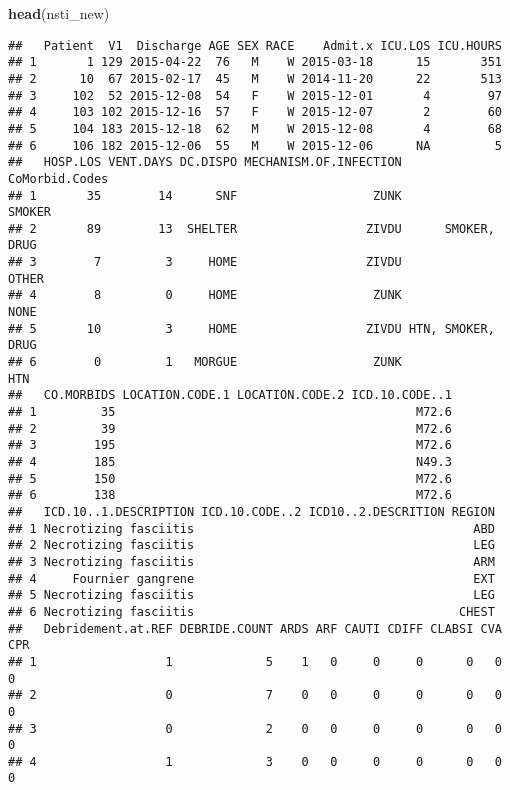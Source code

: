 \documentclass[]{article}
\newenvironment{Shaded}{\begin{snugshade}}{\end{snugshade}}
\newcommand{\KeywordTok}[1]{\textcolor[rgb]{0.13,0.29,0.53}{\textbf{#1}}}
\newcommand{\NormalTok}[1]{#1}
\begin{document}
\begin{Shaded}
\begin{Highlighting}[]
\KeywordTok{head}\NormalTok{(nsti_new)}
\end{Highlighting}
\end{Shaded}

\begin{verbatim}
##   Patient  V1  Discharge AGE SEX RACE    Admit.x ICU.LOS ICU.HOURS
## 1       1 129 2015-04-22  76   M    W 2015-03-18      15       351
## 2      10  67 2015-02-17  45   M    W 2014-11-20      22       513
## 3     102  52 2015-12-08  54   F    W 2015-12-01       4        97
## 4     103 102 2015-12-16  57   F    W 2015-12-07       2        60
## 5     104 183 2015-12-18  62   M    W 2015-12-08       4        68
## 6     106 182 2015-12-06  55   M    W 2015-12-06      NA         5
##   HOSP.LOS VENT.DAYS DC.DISPO MECHANISM.OF.INFECTION    CoMorbid.Codes
## 1       35        14      SNF                   ZUNK            SMOKER
## 2       89        13  SHELTER                  ZIVDU      SMOKER, DRUG
## 3        7         3     HOME                  ZIVDU             OTHER
## 4        8         0     HOME                   ZUNK              NONE
## 5       10         3     HOME                  ZIVDU HTN, SMOKER, DRUG
## 6        0         1   MORGUE                   ZUNK               HTN
##   CO.MORBIDS LOCATION.CODE.1 LOCATION.CODE.2 ICD.10.CODE..1
## 1         35                                          M72.6
## 2         39                                          M72.6
## 3        195                                          M72.6
## 4        185                                          N49.3
## 5        150                                          M72.6
## 6        138                                          M72.6
##   ICD.10..1.DESCRIPTION ICD.10.CODE..2 ICD10..2.DESCRITION REGION
## 1 Necrotizing fasciitis                                       ABD
## 2 Necrotizing fasciitis                                       LEG
## 3 Necrotizing fasciitis                                       ARM
## 4     Fournier gangrene                                       EXT
## 5 Necrotizing fasciitis                                       LEG
## 6 Necrotizing fasciitis                                     CHEST
##   Debridement.at.REF DEBRIDE.COUNT ARDS ARF CAUTI CDIFF CLABSI CVA CPR
## 1                  1             5    1   0     0     0      0   0   0
## 2                  0             7    0   0     0     0      0   0   0
## 3                  0             2    0   0     0     0      0   0   0
## 4                  1             3    0   0     0     0      0   0   0

\end{verbatim}
\end{document}
